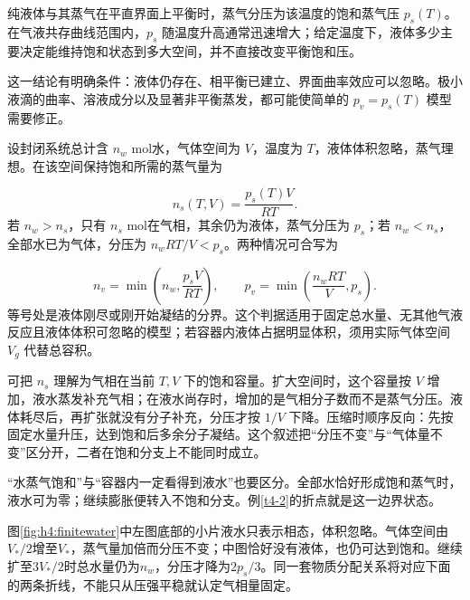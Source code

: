 纯液体与其蒸气在平直界面上平衡时，蒸气分压为该温度的饱和蒸气压 $p_s(T)$。在气液共存曲线范围内，$p_s$ 随温度升高通常迅速增大；给定温度下，液体多少主要决定能维持饱和状态到多大空间，并不直接改变平衡饱和压。

这一结论有明确条件：液体仍存在、相平衡已建立、界面曲率效应可以忽略。极小液滴的曲率、溶液成分以及显著非平衡蒸发，都可能使简单的 $p_v=p_s(T)$ 模型需要修正。


设封闭系统总计含 $n_w$ mol水，气体空间为 $V$，温度为 $T$，液体体积忽略，蒸气理想。在该空间保持饱和所需的蒸气量为

\[n_s(T,V)=\frac{p_s(T)V}{RT}.
\]
若 $n_w>n_s$，只有 $n_s$ mol在气相，其余仍为液体，蒸气分压为 $p_s$；若 $n_w<n_s$，全部水已为气体，分压为 $n_wRT/V<p_s$。两种情况可合写为

\begin{equation}\label{eq:t4vapour}
\boxed{n_v=\min\!\left(n_w,\frac{p_sV}{RT}\right)},\qquad
\boxed{p_v=\min\!\left(\frac{n_wRT}{V},p_s\right)}.
\end{equation}
等号处是液体刚尽或刚开始凝结的分界。这个判据适用于固定总水量、无其他气液反应且液体体积可忽略的模型；若容器内液体占据明显体积，须用实际气体空间 $V_g$ 代替总容积。

可把 $n_s$ 理解为气相在当前 $T,V$ 下的饱和容量。扩大空间时，这个容量按 $V$ 增加，液水蒸发补充气相；在液水尚存时，增加的是气相分子数而不是蒸气分压。液体耗尽后，再扩张就没有分子补充，分压才按 $1/V$ 下降。压缩时顺序反向：先按固定水量升压，达到饱和后多余分子凝结。这个叙述把“分压不变”与“气体量不变”区分开，二者在饱和分支上不能同时成立。

“水蒸气饱和”与“容器内一定看得到液水”也要区分。全部水恰好形成饱和蒸气时，液水可为零；继续膨胀便转入不饱和分支。例\ref{t4-2}的折点就是这一边界状态。

图\ref{fig:h4:finitewater}中左图底部的小片液水只表示相态，体积忽略。气体空间由$V_*/2$增至$V_*$，蒸气量加倍而分压不变；中图恰好没有液体，也仍可达到饱和。继续扩至$3V_*/2$时总水量仍为$n_w$，分压才降为$2p_s/3$。同一套物质分配关系将对应下面的两条折线，不能只从压强平稳就认定气相量固定。



